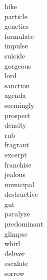 \documentclass[a4paper, 10pt]{ctexart}
\begin{document}
\begin{multicols*}{2}
\begin{description}
\item[hike]

\item[particle]

\item[genetics]

\item[formulate]

\item[impulse]

\item[suicide]

\item[gorgeous]

\item[lord]

\item[sanction]

\item[agenda]

\item[seemingly]

\item[prospect]

\item[density]

\item[rub]

\item[fragrant]

\item[excerpt]

\item[franchise]

\item[jealous]

\item[municipal]

\item[destructive]

\item[gut]

\item[paralyze]

\item[predominant]

\item[glimpse]

\item[whirl]

\item[deliver]

\item[escalate]

\item[sorrow]


\end{description}
\end{multicols*}
\end{document}
